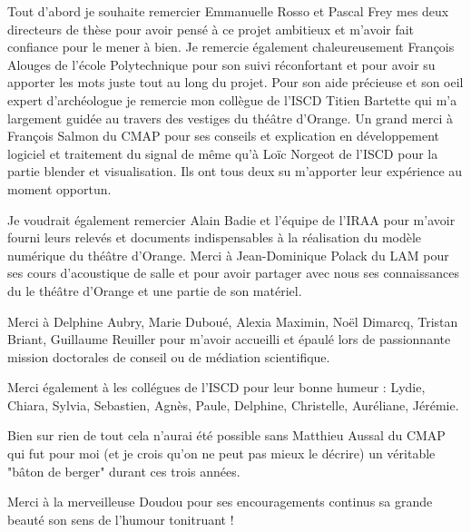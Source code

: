 Tout d'abord je souhaite remercier Emmanuelle Rosso et Pascal Frey mes deux directeurs de thèse pour avoir pensé à ce projet ambitieux et m'avoir fait confiance pour le mener à bien. Je remercie également chaleureusement François Alouges de l'école Polytechnique pour son suivi réconfortant et pour avoir su apporter les mots juste tout au long du projet. Pour son aide précieuse et son oeil expert d'archéologue je remercie mon collègue de l'ISCD Titien Bartette qui m'a largement guidée au travers des vestiges du théâtre d'Orange. Un grand merci à François Salmon du CMAP pour ses conseils et explication en développement logiciel et traitement du signal de même qu'à Loïc Norgeot de l'ISCD pour la partie blender et visualisation. Ils ont tous deux su m'apporter leur expérience au moment opportun. 

Je voudrait également remercier Alain Badie et l'équipe de l'IRAA pour m'avoir fourni leurs relevés et documents indispensables à la réalisation du modèle numérique du théâtre d'Orange. Merci à Jean-Dominique Polack du LAM pour ses cours d'acoustique de salle et pour avoir partager avec nous ses connaissances du le théâtre d'Orange et une partie de son matériel.

Merci à Delphine Aubry, Marie Duboué, Alexia Maximin, Noël Dimarcq, Tristan Briant, Guillaume Reuiller pour m'avoir accueilli et épaulé lors de passionnante mission doctorales de conseil ou de médiation scientifique.

Merci également à les collégues de l'ISCD pour leur bonne humeur : Lydie, Chiara, Sylvia, Sebastien, Agnès, Paule, Delphine, Christelle, Auréliane, Jérémie.

Bien sur rien de tout cela n'aurai été possible sans Matthieu Aussal du CMAP qui fut pour moi (et je crois qu'on ne peut pas mieux le décrire) un véritable "bâton de berger" durant ces trois années.

Merci à la merveilleuse Doudou pour ses encouragements continus sa grande beauté son sens de l'humour tonitruant !

